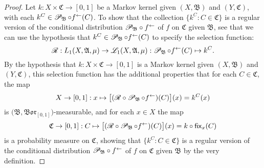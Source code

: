\documentclass[
twoside=true,
paper=letter,
fontsize=9pt,
pagesize=auto,
leqno,
openany,
headsepline,
overfullrule,
]{scrbook}
\theoremstyle{plain}
\theoremstyle{plain}
\theoremstyle{definition}
\theoremstyle{bfnoteitalic}
\theoremstyle{bfnoteroman}
\newcommand{\sigalg}[1]{\mathfrak{#1}}
\newcommand{\cali}[1]{\mathscr{#1}}
\newcommand{\sfop}[1]{\mathsf{#1}}
\newcommand{\condprobop}[1]{\mathop{\cali{P}\hspace{-1pt}}\nolimits_{#1}}
\newcommand{\borel}{\mathfrak{Bor}}
\newcommand{\preimage}[1]{#1^{\leftarrow}}
\newcommand{\sigmaalgebra}{\sigalg{A}}
\newcommand{\sigmaalgebraii}{\sigalg{B}}
\newcommand{\sigmaalgebraiii}{\sigalg{C}}
\newcommand{\Lone}{L_1(\measurespace, \sigmaalgebra, \measure)}
\newcommand{\caliLone}{\cali{L}_1(\measurespace, \sigmaalgebra, \measure)}
\newcommand{\function}{f}
\newcommand{\measurespace}{X}
\newcommand{\measurespaceii}{Y}
\newcommand{\mspaceelt}{x}
\newcommand{\measure}{\mu}
\newcommand{\setiii}{C}
\newcommand{\regular}{\cali{R}}
\newcommand{\markovkernel}{k}
\newcommand{\fixinthefirst}[1]{\sfop{fix}_{#1}}
\begin{document}
\begin{proof}
Let 
$\markovkernel:\measurespace\times\sigmaalgebraiii\to [0,1]$ 
be a Markov kernel given $(\measurespace, \sigmaalgebraii)$ and $(\measurespaceii, \sigmaalgebraiii)$, with each
$\markovkernel^{\setiii} \in \condprobop{\sigmaalgebraii}\circ \preimage{\function}(\setiii)$.
To show that the collection 
$\{ \markovkernel^{\setiii} :
\setiii\in\sigmaalgebraiii\}$ 
is a regular version of the conditional distribution 
${\condprobop{\sigmaalgebraii}}\circ \preimage{\function}$ of 
$\function$ on $\sigmaalgebraiii$ given $\sigmaalgebraii$, see that we can 
use the hypothesis that 
$\markovkernel^{\setiii} \in \condprobop{\sigmaalgebraii}\circ \preimage{\function}(\setiii)$
to specify the selection function:
\[
\regular:\Lone\to\caliLone:
\condprobop{\sigmaalgebraii}\circ \preimage{\function}(\setiii) \mapsto
\markovkernel^{\setiii}.
\]
By the hypothesis that
$\markovkernel:\measurespace\times\sigmaalgebraiii\to [0,1]$ 
is a Markov kernel given $(\measurespace, \sigmaalgebraii)$ and $(\measurespaceii, \sigmaalgebraiii)$,
this selection function has the  additional properties that for each
$\setiii\in\sigmaalgebraiii$, the map 
\[
\measurespace\to [0,1] : \mspaceelt\mapsto
\bigl[ (\regular\circ\condprobop{\sigmaalgebraii}\circ\preimage{\function}) (\setiii)\bigr](\mspaceelt) 
=
\markovkernel^{\setiii} (\mspaceelt)
\]
is $\bigl(\sigmaalgebraii, \borel_{[0,1]}\bigr)$\hyp{}measurable, and for each 
$\mspaceelt\in\measurespace$ the  map
\[
\sigmaalgebraiii\to [0,1]: \setiii \mapsto 
\bigl[ (\regular\circ\condprobop{\sigmaalgebraii}\circ\preimage{\function}) (\setiii)\bigr](\mspaceelt)
= \markovkernel\circ\fixinthefirst{\mspaceelt}(\setiii)
\]
is a probability measure on $\sigmaalgebraiii$, 
showing that 
$\{ \markovkernel^{\setiii} :
\setiii\in\sigmaalgebraiii\}$ 
is a regular version of the conditional distribution 
${\condprobop{\sigmaalgebraii}}\circ \preimage{\function}$ of 
$\function$ on $\sigmaalgebraiii$ given $\sigmaalgebraii$ by the very definition.


\end{proof}
\end{document}
